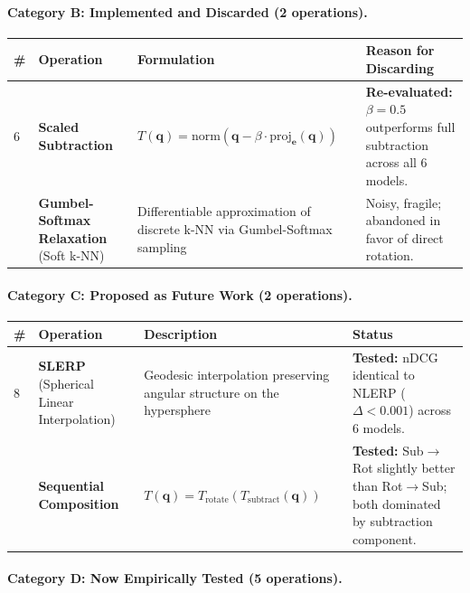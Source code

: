 \documentclass{article}
\begin{document}
\paragraph{Category B: Implemented and Discarded (2 operations).}

\begin{longtable}{>{\raggedright}p{0.3cm} >{\raggedright}p{2.8cm} >{\raggedright}p{5.5cm} p{4.5cm}}
\toprule
\# & Operation & Formulation & Reason for Discarding \\
\midrule
\endhead
6 & \textbf{Scaled Subtraction} & $T(\mathbf{q}) = \text{norm}(\mathbf{q} - \beta \cdot \text{proj}_\mathbf{e}(\mathbf{q}))$ & \textbf{Re-evaluated:} $\beta = 0.5$ outperforms full subtraction across all 6 models. \\
\addlinespace
7 & \textbf{Gumbel-Softmax Relaxation} (Soft k-NN) & Differentiable approximation of discrete k-NN via Gumbel-Softmax sampling & Noisy, fragile; abandoned in favor of direct rotation. \\
\bottomrule
\end{longtable}

\paragraph{Category C: Proposed as Future Work (2 operations).}

\begin{longtable}{>{\raggedright}p{0.3cm} >{\raggedright}p{2.8cm} >{\raggedright}p{5.5cm} p{4.5cm}}
\toprule
\# & Operation & Description & Status \\
\midrule
\endhead
8 & \textbf{SLERP} (Spherical Linear Interpolation) & Geodesic interpolation preserving angular structure on the hypersphere & \textbf{Tested:} nDCG identical to NLERP ($\Delta < 0.001$) across 6 models. \\
\addlinespace
9 & \textbf{Sequential Composition} & $T(\mathbf{q}) = T_{\text{rotate}}(T_{\text{subtract}}(\mathbf{q}))$ & \textbf{Tested:} Sub$\to$Rot slightly better than Rot$\to$Sub; both dominated by subtraction component. \\
\bottomrule
\end{longtable}

\paragraph{Category D: Now Empirically Tested (5 operations).}
\end{document}
